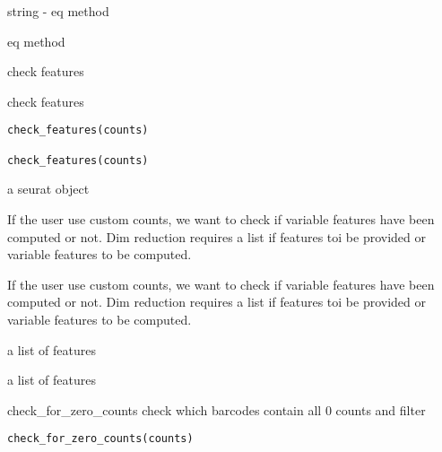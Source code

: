 \documentclass[a4paper]{book}
\begin{document}
%
\begin{Arguments}
\begin{ldescription}
\item[\code{method}] string - eq method
\end{ldescription}
\end{Arguments}
%
\begin{Value}
eq method
\end{Value}
%
\begin{Description}
check features

check features
\end{Description}
%
\begin{Usage}
\begin{verbatim}
check_features(counts)

check_features(counts)
\end{verbatim}
\end{Usage}
%
\begin{Arguments}
\begin{ldescription}
\item[\code{counts}] a seurat object
\end{ldescription}
\end{Arguments}
%
\begin{Details}
If the user use custom counts, we want to check
if variable features have been computed or not. Dim reduction
requires a list if features toi be provided or variable features
to be computed.

If the user use custom counts, we want to check
if variable features have been computed or not. Dim reduction
requires a list if features toi be provided or variable features
to be computed.
\end{Details}
%
\begin{Value}
a list of features

a list of features
\end{Value}
%
\begin{Description}
check\_for\_zero\_counts 
check which barcodes contain all 0 counts and filter
\end{Description}
%
\begin{Usage}
\begin{verbatim}
check_for_zero_counts(counts)
\end{verbatim}
\end{Usage}
\end{document}
